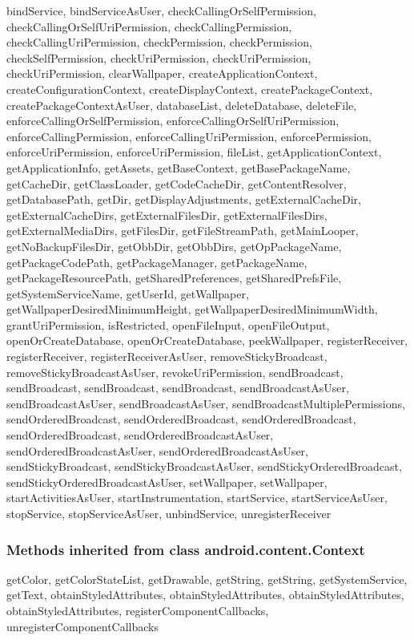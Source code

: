 bindService, bindServiceAsUser, checkCallingOrSelfPermission, checkCallingOrSelfUriPermission, checkCallingPermission, checkCallingUriPermission, checkPermission, checkPermission, checkSelfPermission, checkUriPermission, checkUriPermission, checkUriPermission, clearWallpaper, createApplicationContext, createConfigurationContext, createDisplayContext, createPackageContext, createPackageContextAsUser, databaseList, deleteDatabase, deleteFile, enforceCallingOrSelfPermission, enforceCallingOrSelfUriPermission, enforceCallingPermission, enforceCallingUriPermission, enforcePermission, enforceUriPermission, enforceUriPermission, fileList, getApplicationContext, getApplicationInfo, getAssets, getBaseContext, getBasePackageName, getCacheDir, getClassLoader, getCodeCacheDir, getContentResolver, getDatabasePath, getDir, getDisplayAdjustments, getExternalCacheDir, getExternalCacheDirs, getExternalFilesDir, getExternalFilesDirs, getExternalMediaDirs, getFilesDir, getFileStreamPath, getMainLooper, getNoBackupFilesDir, getObbDir, getObbDirs, getOpPackageName, getPackageCodePath, getPackageManager, getPackageName, getPackageResourcePath, getSharedPreferences, getSharedPrefsFile, getSystemServiceName, getUserId, getWallpaper, getWallpaperDesiredMinimumHeight, getWallpaperDesiredMinimumWidth, grantUriPermission, isRestricted, openFileInput, openFileOutput, openOrCreateDatabase, openOrCreateDatabase, peekWallpaper, registerReceiver, registerReceiver, registerReceiverAsUser, removeStickyBroadcast, removeStickyBroadcastAsUser, revokeUriPermission, sendBroadcast, sendBroadcast, sendBroadcast, sendBroadcast, sendBroadcastAsUser, sendBroadcastAsUser, sendBroadcastAsUser, sendBroadcastMultiplePermissions, sendOrderedBroadcast, sendOrderedBroadcast, sendOrderedBroadcast, sendOrderedBroadcast, sendOrderedBroadcastAsUser, sendOrderedBroadcastAsUser, sendOrderedBroadcastAsUser, sendStickyBroadcast, sendStickyBroadcastAsUser, sendStickyOrderedBroadcast, sendStickyOrderedBroadcastAsUser, setWallpaper, setWallpaper, startActivitiesAsUser, startInstrumentation, startService, startServiceAsUser, stopService, stopServiceAsUser, unbindService, unregisterReceiver\\

\subsubsection{Methods inherited from class android.content.Context}

getColor, getColorStateList, getDrawable, getString, getString, getSystemService, getText, obtainStyledAttributes, obtainStyledAttributes, obtainStyledAttributes, obtainStyledAttributes, registerComponentCallbacks, unregisterComponentCallbacks\\

